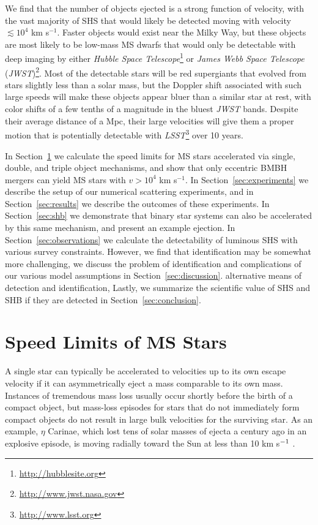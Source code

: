 \documentclass[a4paper,twocolumn]{emulateapj}
\begin{document}
{We find that the number of objects ejected is a strong function of velocity, with the vast majority of SHS that would likely be detected moving with velocity $\lesssim 10^{4}$ km s$^{-1}$. Faster objects would exist near the Milky Way, but these objects are most likely to be low-mass MS dwarfs that would only be detectable with deep imaging by either {\it Hubble Space Telescope}\footnote{\url{http://hubblesite.org}} or {\it James Webb Space Telescope} ({\it JWST})\footnote{\url{http://www.jwst.nasa.gov}}. Most of the detectable stars will be red supergiants that evolved from stars slightly less than a solar mass, but the Doppler shift associated with such large speeds will make these objects appear bluer than a similar star at rest, with color shifts of a few tenths of a magnitude in the bluest {\it JWST} bands. Despite their average distance of a Mpc, their large velocities will give them a proper motion that is potentially detectable with {\it LSST}\footnote{\url{http://www.lsst.org}} over 10 years.

In Section~\ref{sec:speedlimits} we calculate the speed limits for MS stars accelerated via single, double, and triple object mechanisms, and show that only eccentric BMBH mergers can yield MS stars with $v > 10^{4}$ km s$^{-1}$. In Section~\ref{sec:experiments} we describe the setup of our numerical scattering experiments, and in Section~\ref{sec:results} we describe the outcomes of these experiments. In Section~\ref{sec:shb} we demonstrate that binary star systems can also be accelerated by this same mechanism, and present an example ejection. In Section~\ref{sec:observations} we calculate the detectability of luminous SHS with various survey constraints. However, we find that identification may be somewhat more challenging, we discuss the problem of identification and complications of our various model assumptions in Section~\ref{sec:discussion}. alternative means of detection and identification, Lastly, we summarize the scientific value of SHS and SHB if they are detected in Section~\ref{sec:conclusion}.

\section{Speed Limits of MS Stars}\label{sec:speedlimits}
A single star can typically be accelerated to velocities up to its own escape velocity if it can asymmetrically eject a mass comparable to its own mass. Instances of tremendous mass loss usually occur shortly before the birth of a compact object, but mass-loss episodes for stars that do not immediately form compact objects do not result in large bulk velocities for the surviving star. As an example, $\eta$ Carinae, which lost tens of solar masses of ejecta a century ago in an explosive episode, is moving radially toward the Sun at less than 10 km s$^{\smash{-1}}$ \citep{Smith:2004a}.

}
\end{document}
